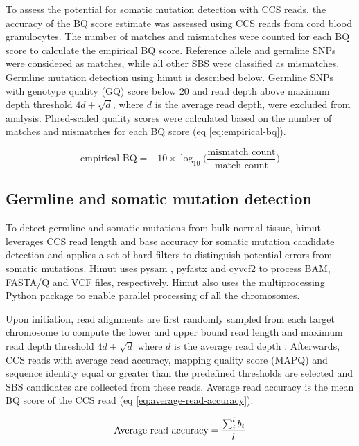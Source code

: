 To assess the potential for somatic mutation detection with CCS reads, the accuracy of the BQ score estimate was assessed using CCS reads from cord blood granulocytes. The number of matches and mismatches were counted for each BQ score to calculate the empirical BQ score. Reference allele and germline SNPs were considered as matches, while all other SBS were classified as mismatches. Germline mutation detection using himut is described below. Germline SNPs with genotype quality (GQ) score below 20 and read depth above maximum depth threshold $4d + \sqrt{d}$, where $d$ is the average read depth, were excluded from analysis. Phred-scaled quality scores were calculated based on the number of matches and mismatches for each BQ score (eq \ref{eq:empirical-bq}).

\begin{equation} \label{eq:empirical-bq}
\text{empirical BQ} = -10 \times \log_{10} \Big( \frac{\text{mismatch count}}{\text{match count}} \Big)
\end{equation}

\subsection{Germline and somatic mutation detection}

To detect germline and somatic mutations from bulk normal tissue, himut leverages CCS read length and base accuracy for somatic mutation candidate detection and applies a set of hard filters to distinguish potential errors from somatic mutations. Himut uses pysam \cite{pysam}, pyfastx \cite{Du2021-ya} and cyvcf2 \cite{Pedersen2017-ld} to process BAM, FASTA/Q and VCF files, respectively. Himut also uses the multiprocessing Python package \cite{} to enable parallel processing of all the chromosomes. 

Upon initiation, read alignments are first randomly sampled from each target chromosome to compute the lower and upper bound read length and maximum read depth threshold $4d + \sqrt{d}$ where $d$ is the average read depth \cite{}. Afterwards, CCS reads with average read accuracy, mapping quality score (MAPQ) and sequence identity equal or greater than the predefined thresholds are selected and SBS candidates are collected from these reads. Average read accuracy is the mean BQ score of the CCS read (eq \ref{eq:average-read-accuracy}).

\begin{equation} \label{eq:average-read-accuracy}
\text{Average read accuracy} = \frac{\sum^{l}_{i}b_{i}}{l} \smallskip
\end{equation}

